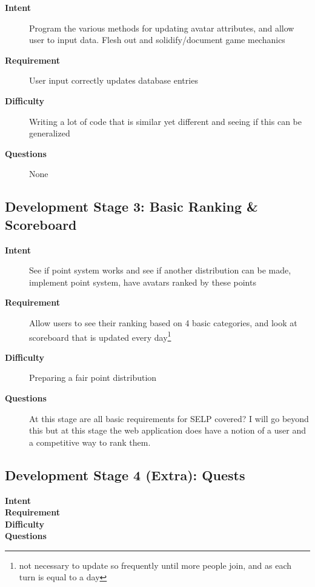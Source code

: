 \documentclass[11pt, a4paper]{article}
\begin{document}
\begin{description}
\item[\textbf{Intent}] Program the various methods for updating avatar attributes, and allow user to input data. Flesh out and solidify/document game mechanics
\item[\textbf{Requirement}] User input correctly updates database entries
\item[\textbf{Difficulty}] Writing a lot of code that is similar yet different and seeing if this can be generalized
\item[\textbf{Questions}] None
\end{description}

\subsection{Development Stage 3: Basic Ranking \& Scoreboard}

\begin{description}
\item[\textbf{Intent}] See if point system works and see if another distribution can be made, implement point system, have avatars ranked by these points
\item[\textbf{Requirement}] Allow users to see their ranking based on 4 basic categories, and look at scoreboard that is updated every day\footnote{not necessary to update so frequently until more people join, and as each turn is equal to a day}
\item[\textbf{Difficulty}] Preparing a fair point distribution
\item[\textbf{Questions}] At this stage are all basic requirements for SELP covered? I will go beyond this but at this stage the web application does have a notion of a user and a competitive way to rank them.
\end{description}

\subsection{Development Stage 4 (Extra): Quests}

\begin{description}
\item[\textbf{Intent}]
\item[\textbf{Requirement}]
\item[\textbf{Difficulty}]
\item[\textbf{Questions}]
\end{description}
\end{document}
